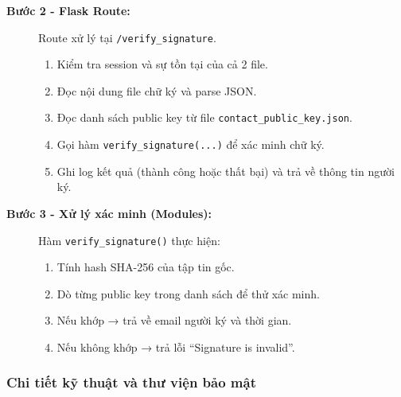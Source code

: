 \begin{description}
    \item[\textbf{Bước 2 - Flask Route:}] Route xử lý tại \texttt{/verify\_signature}.
    \begin{enumerate}
        \item Kiểm tra session và sự tồn tại của cả 2 file.
        \item Đọc nội dung file chữ ký và parse JSON.
        \item Đọc danh sách public key từ file \texttt{contact\_public\_key.json}.
        \item Gọi hàm \texttt{verify\_signature(...)} để xác minh chữ ký.
        \item Ghi log kết quả (thành công hoặc thất bại) và trả về thông tin người ký.
    \end{enumerate}

    \item[\textbf{Bước 3 - Xử lý xác minh (Modules):}] Hàm \texttt{verify\_signature()} thực hiện:
    \begin{enumerate}
        \item Tính hash SHA-256 của tập tin gốc.
        \item Dò từng public key trong danh sách để thử xác minh.
        \item Nếu khớp → trả về email người ký và thời gian.
        \item Nếu không khớp → trả lỗi “Signature is invalid”.
    \end{enumerate}
\end{description}

\subsubsection*{Chi tiết kỹ thuật và thư viện bảo mật}

